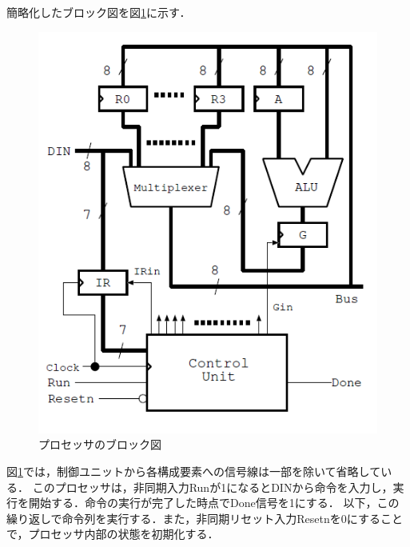 \documentclass{jlreq}
\numberwithin{equation}{section}
\begin{document}
簡略化したブロック図を図\ref{fig:processor_block}に示す．
\begin{figure}[H]
	\centering
	\includegraphics{assets/processor_block_image.png}
	\caption{プロセッサのブロック図}
	\label{fig:processor_block}
\end{figure}
図\ref{fig:processor_block}では，制御ユニットから各構成要素への信号線は一部を除いて省略している．
このプロセッサは，非同期入力Runが1になるとDINから命令を入力し，実行を開始する．命令の実行が完了した時点でDone信号を1にする．
以下，この繰り返しで命令列を実行する．また，非同期リセット入力Resetnを0にすることで，プロセッサ内部の状態を初期化する．
\end{document}
